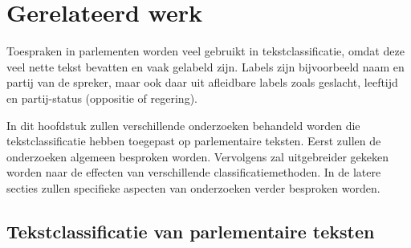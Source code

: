 \section{Gerelateerd werk}
\label{sec:rel}

Toespraken in parlementen worden veel gebruikt in tekstclassificatie, omdat deze veel nette tekst bevatten en vaak gelabeld zijn. Labels zijn bijvoorbeeld naam en partij van de spreker, maar ook daar uit afleidbare labels zoals geslacht, leeftijd en partij-status (oppositie of regering).\par
In dit hoofdstuk zullen verschillende onderzoeken behandeld worden die tekstclassificatie hebben toegepast op parlementaire teksten. Eerst zullen de onderzoeken algemeen besproken worden. Vervolgens zal uitgebreider gekeken worden naar de effecten van verschillende classificatiemethoden. In de latere secties zullen specifieke aspecten van onderzoeken verder besproken worden.

\subsection{Tekstclassificatie van parlementaire teksten}

